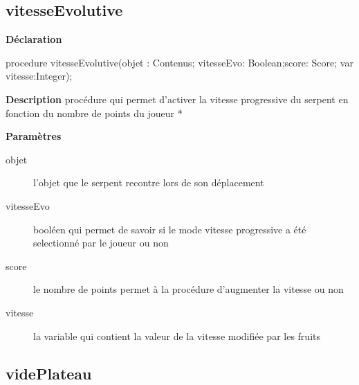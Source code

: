 \documentclass{report}
\newif\ifpdf
\begin{document}
\subsection*{vitesseEvolutive}
\fi
\label{Jouer-vitesseEvolutive}
\begin{list}{}{
\setlength{\itemindent}{0cm}
\setlength{\listparindent}{0cm}
\setlength{\leftmargin}{\evensidemargin}
\addtolength{\leftmargin}{\tmplength}
\settowidth{\labelsep}{X}
\addtolength{\leftmargin}{\labelsep}
\setlength{\labelwidth}{\tmplength}
}
\item[\textbf{Déclaration}\hfill]
\ifpdf
\begin{flushleft}
\fi
\begin{ttfamily}
procedure vitesseEvolutive(objet : Contenus; vitesseEvo: Boolean;score: Score; var vitesse:Integer);\end{ttfamily}

\ifpdf
\end{flushleft}
\fi

\par
\item[\textbf{Description}]
procédure qui permet d'activer la vitesse progressive du serpent en fonction du nombre de points du joueur     *\par
\item[\textbf{Paramètres}]
\begin{description}
\item[objet] l'objet que le serpent recontre lors de son déplacement
\item[vitesseEvo] booléen qui permet de savoir si le mode vitesse progressive a été selectionné par le joueur ou non
\item[score] le nombre de points permet à la procédure d'augmenter la vitesse ou non
\item[vitesse] la variable qui contient la valeur de la vitesse modifiée par les fruits
\end{description}


\end{list}
\ifpdf
\subsection*{\large{\textbf{videPlateau}}\normalsize\hspace{1ex}\hrulefill}
\else
\end{document}
